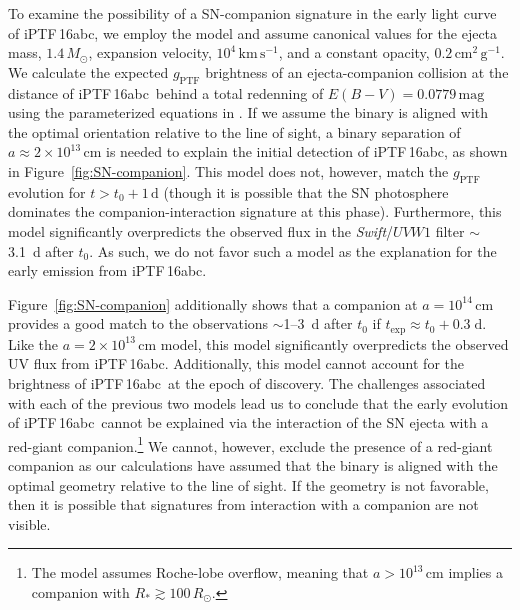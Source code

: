\documentclass[twocolumn]{aastex61}
\newcommand{\sm}{M_\odot}
\newcommand{\abc}{iPTF\,16abc}
\begin{document}
To examine the possibility of a SN-companion signature in the early
light curve of \abc, we employ the \citet{2010ApJ...708.1025K}
model and assume canonical values for the ejecta mass, $1.4\,\sm$, expansion velocity,
$10^{4}\,\textrm{km}\,\textrm{s}^{-1}$, and a constant opacity, 
$0.2\,\textrm{cm}^2\,\textrm{g}^{-1}$. We calculate the expected 
$g_\mathrm{PTF}$ brightness of an ejecta-companion collision at the 
distance of \abc\ behind a total redenning of $E(B-V) = 0.0779 \, \mathrm{mag}$ using the parameterized equations in 
\citet{2012ApJ...749...18B}. If we assume the binary is aligned with the optimal orientation relative to the line of sight, a binary separation of $a \approx 2 \times 10^{13}\, \mathrm{cm}$ is needed to explain the initial detection of \abc, as shown in Figure~\ref{fig:SN-companion}. This model does not, however, match the $g_\mathrm{PTF}$ evolution for $t > t_0 + 1 \, \mathrm{d}$ (though it is possible that the SN photosphere dominates the companion-interaction signature at this phase). Furthermore, this model significantly overpredicts the observed flux in the \textit{Swift}/$UVW1$ filter $\sim$3.1~d after $t_0$. As such, we do not favor such a model as the explanation for the early emission from \abc.

Figure~\ref{fig:SN-companion} additionally shows that a companion at $a = 10^{14} \, \mathrm{cm}$ provides a good match to the observations $\sim$1--3~d after $t_0$ if $t_\mathrm{exp} \approx t_0 + 0.3 \; \mathrm{d}$. Like the $a = 2 \times 10^{13} \, \mathrm{cm}$ model, this model significantly overpredicts the observed UV flux from \abc. Additionally, this model cannot account for the brightness of \abc\ at the epoch of discovery. The challenges associated with each of the previous two models lead us to conclude that the early evolution of \abc\ cannot be explained via the interaction of the SN ejecta with a red-giant companion.\footnote{The \citet{2010ApJ...708.1025K} model assumes Roche-lobe overflow, meaning that $a > 10^{13} \, \mathrm{cm}$ implies a companion with $R_\ast \gtrsim 100 \, R_\odot$.} We cannot, however, exclude the presence of a red-giant companion as our calculations have assumed that the binary is aligned with the optimal geometry relative to the line of sight. If the geometry is not favorable, then it is possible that signatures from interaction with a companion are not visible. 

\end{document}

